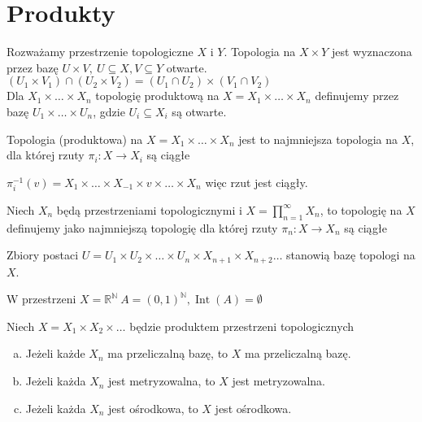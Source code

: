 \section{Produkty} 
\begin{df} 
    Rozważamy przestrzenie topologiczne $X$ i $Y$. Topologia na $X \times Y$ jest 
    wyznaczona przez bazę $U \times V,\ U \subseteq X, V \subseteq Y$ otwarte. \\ 
    $(U_1 \times V_1) \cap (U_2 \times V_2) = (U_1 \cap U_2) \times (V_1 \cap V_2)$ \\
    Dla $X_1 \times \ldots \times X_n$ topologię produktową na 
    $X = X_1 \times \ldots \times X_n$ 
    definujemy przez bazę $U_1 \times \ldots \times U_n$, gdzie $U_i \subseteq X_i$ są 
    otwarte. 
\end{df} 
\begin{tw} 
    Topologia (produktowa) na $X = X_1 \times \ldots \times X_n$ jest to najmniejsza 
    topologia na $X$, dla której rzuty $\pi_i: X \to X_i$ są ciągłe 
\end{tw} 
\begin{dd} 
    $\pi_i^{-1} (v) = X_1 \times \ldots \times X_{-1} \times v \times \ldots \times X_n$ 
    więc rzut jest ciągły. 
\end{dd} 
\begin{df} 
    Niech $X_n$ będą przestrzeniami topologicznymi i $X = \prod\limits_{n=1}^\infty
    X_n$, to topologię na $X$ definujemy jako najmniejszą topologię dla której rzuty 
    $\pi_n : X \to X_n$ są ciągłe 
\end{df} 
\begin{tw} 
    Zbiory postaci $U = U_1 \times U_2 \times \ldots \times U_n \times X_{n+1} 
    \times X_{n+2} \ldots$
    stanowią bazę topologi na $X$.
\end{tw} 
\begin{prz} 
    W przestrzeni $X = \mathbb R ^{\mathbb N} \ A = (0,1)^{\mathbb N}, \operatorname{Int}
    (A) = \emptyset$
\end{prz} 
\begin{tw} 
    Niech $X = X_1 \times X_2 \times \ldots$ będzie produktem przestrzeni topologicznych 
    \begin{enumerate}[(a)] 
        \item Jeżeli każde $X_n$ ma przeliczalną bazę, to $X$ ma przeliczalną bazę. 
        \item Jeżeli każda $X_n$ jest metryzowalna, to $X$ jest metryzowalna. 
        \item Jeżeli każda $X_n$ jest ośrodkowa, to $X$ jest ośrodkowa. 
    \end{enumerate} 
\end{tw}
